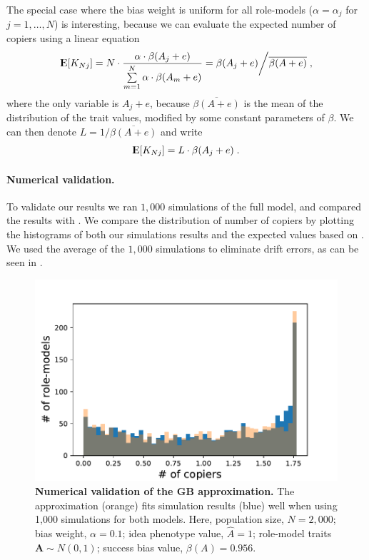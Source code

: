 \documentclass[12pt]{extarticle}
\DeclareMathOperator*{\E}{{\rm I\kern-.3em E}}
\let\vec\mathbf
\begin{document}
The special case where the bias weight is uniform for all role-models ($\alpha = \alpha_j$ for $j=1,\ldots, N$) is interesting, because we can evaluate the expected number of copiers using a linear equation
\begin{equation}
\E[K_{Nj}]= N\cdot\frac{\alpha\cdot\beta(A_j+e)}{\sum\limits_{m=1}^{N}\alpha\cdot\beta(A_m+e)} =\beta(A_j+e) \bigg/ \overline{\beta(A+e)} \;,
\end{equation}
where the only variable is $A_j+e$, because $\overline{\beta(A+e)}$ is the mean of the distribution of the trait values, modified by some constant parameters of $\beta$.
We can then denote $L = 1/\overline{\beta(A+e)}$ and write
\begin{equation}\label{eq:linearEq}
\E[K_{Nj}] = L\cdot \beta(A_j+e) \;.
\end{equation}

\paragraph{Numerical validation.}
To validate our results we ran $1,000$ simulations of the full model, and compared the results with .
We compare the distribution of number of copiers by plotting the histograms of both our simulations results and the expected values based on .
We used the average of the $1,000$ simulations to eliminate drift errors, as can be seen in .

\begin{figure}[h]
    \includegraphics[width=0.7\linewidth]{../figures/final/GBD_validation.pdf}
  \caption{
  \textbf{Numerical validation of the GB approximation.}
  The approximation (orange) fits simulation results (blue) well when using 1,000 simulations for both models.
  Here, population size, $N=2,000$; bias weight, $\alpha=0.1$; idea phenotype value, $\hat{A}=1$; role-model traits $\vec{A} \sim N(0,1)$; success bias value, $\beta(A)=0.956$.}	
  \label{fig:GBD}
\end{figure}
\end{document}
